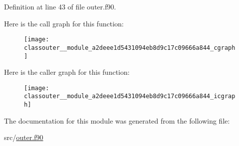 Definition at line 43 of file outer.\-f90.



Here is the call graph for this function\-:\nopagebreak
\begin{figure}[H]
\begin{center}
\leavevmode
\texttt{[image: classouter\_\_module\_a2deee1d5431094eb8d9c17c09666a844\_cgraph]}
\end{center}
\end{figure}




Here is the caller graph for this function\-:\nopagebreak
\begin{figure}[H]
\begin{center}
\leavevmode
\texttt{[image: classouter\_\_module\_a2deee1d5431094eb8d9c17c09666a844\_icgraph]}
\end{center}
\end{figure}




The documentation for this module was generated from the following file\-:\begin{DoxyCompactItemize}
\item 
src/\hyperlink{outer_8f90}{outer.\-f90}\end{DoxyCompactItemize}
